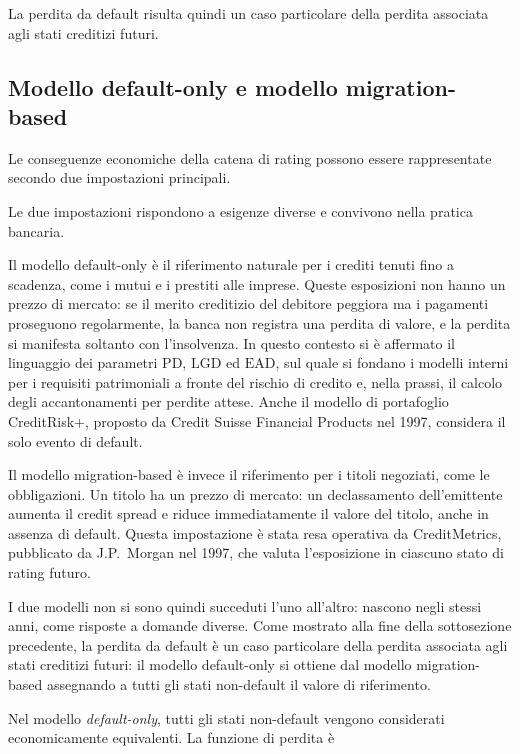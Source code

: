 La perdita da default risulta quindi un caso particolare della
perdita associata agli stati creditizi futuri.

\subsection{Modello default-only e modello migration-based}

\label{subsec:cap9-default-only-migration-based}

Le conseguenze economiche della catena di rating possono essere
rappresentate secondo due impostazioni principali.

Le due impostazioni rispondono a esigenze diverse e convivono nella
pratica bancaria.

Il modello default-only \`e il riferimento naturale per i crediti tenuti
fino a scadenza, come i mutui e i prestiti alle imprese. Queste
esposizioni non hanno un prezzo di mercato: se il merito creditizio del
debitore peggiora ma i pagamenti proseguono regolarmente, la banca non
registra una perdita di valore, e la perdita si manifesta soltanto con
l'insolvenza. In questo contesto si \`e affermato il linguaggio dei
parametri $\mathrm{PD}$, $\mathrm{LGD}$ ed $\mathrm{EAD}$, sul quale si
fondano i modelli interni per i requisiti patrimoniali a fronte del
rischio di credito e, nella prassi, il calcolo degli accantonamenti per
perdite attese. Anche il modello di portafoglio CreditRisk+, proposto da
Credit Suisse Financial Products nel 1997, considera il solo evento di
default.

Il modello migration-based \`e invece il riferimento per i titoli
negoziati, come le obbligazioni. Un titolo ha un prezzo di mercato: un
declassamento dell'emittente aumenta il credit spread e riduce
immediatamente il valore del titolo, anche in assenza di default. Questa
impostazione \`e stata resa operativa da CreditMetrics, pubblicato da
J.P.~Morgan nel 1997, che valuta l'esposizione in ciascuno stato di
rating futuro.

I due modelli non si sono quindi succeduti l'uno all'altro: nascono
negli stessi anni, come risposte a domande diverse. Come mostrato alla
fine della sottosezione precedente, la perdita da default \`e un caso
particolare della perdita associata agli stati creditizi futuri: il
modello default-only si ottiene dal modello migration-based assegnando a
tutti gli stati non-default il valore di riferimento.


Nel modello \emph{default-only}, tutti gli stati non-default vengono
considerati economicamente equivalenti. La funzione di perdita \`{e}

